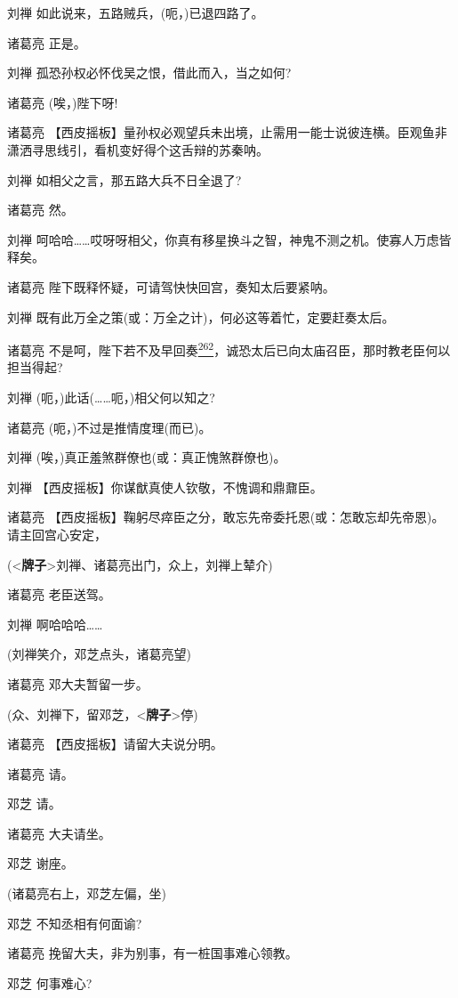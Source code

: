 刘禅 如此说来，五路贼兵，(呃，)已退四路了。

诸葛亮 正是。

刘禅 孤恐孙权必怀伐吴之恨，借此而入，当之如何?

诸葛亮 (唉，)陛下呀!

诸葛亮
【西皮摇板】量孙权必观望兵未出境，止需用一能士说彼连横。臣观鱼非潇洒寻思线引，看机变好得个这舌辩的苏秦呐。

刘禅 如相父之言，那五路大兵不日全退了?

诸葛亮 然。

刘禅
呵哈哈\ldots{}\ldots{}哎呀呀相父，你真有移星换斗之智，神鬼不测之机。使寡人万虑皆释矣。

诸葛亮 陛下既释怀疑，可请驾快快回宫，奏知太后要紧呐。

刘禅 既有此万全之策(或：万全之计)，何必这等着忙，定要赶奏太后。

诸葛亮
不是呵，陛下若不及早回奏\protect\hyperlink{fn262}{\textsuperscript{262}}，诚恐太后已向太庙召臣，那时教老臣何以担当得起?

刘禅 (呃，)此话(\ldots{}\ldots{}呃，)相父何以知之?

诸葛亮 (呃，)不过是推情度理(而已)。

刘禅 (唉，)真正羞煞群僚也(或：真正愧煞群僚也)。

刘禅 【西皮摇板】你谋猷真使人钦敬，不愧调和鼎鼐臣。

诸葛亮
【西皮摇板】鞠躬尽瘁臣之分，敢忘先帝委托恩(或：怎敢忘却先帝恩)。请主回宫心安定，

(\textless{}\textbf{牌子}\textgreater{}刘禅、诸葛亮出门，众上，刘禅上辇介)

诸葛亮 老臣送驾。

刘禅 啊哈哈哈\ldots{}\ldots{}

(刘禅笑介，邓芝点头，诸葛亮望)

诸葛亮 邓大夫暂留一步。

(众、刘禅下，留邓芝，\textless{}\textbf{牌子}\textgreater{}停)

诸葛亮 【西皮摇板】请留大夫说分明。

诸葛亮 请。

邓芝 请。

诸葛亮 大夫请坐。

邓芝 谢座。

(诸葛亮右上，邓芝左偏，坐)

邓芝 不知丞相有何面谕?

诸葛亮 挽留大夫，非为别事，有一桩国事难心领教。

邓芝 何事难心?

